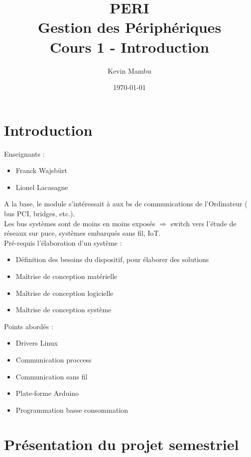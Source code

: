 \documentclass[10pt]{article}
\author{Kevin Mambu}
\date{\today}
\title{PERI \\ Gestion des Périphériques \\ Cours 1 - Introduction}
\begin{document}
\maketitle

\newpage
\tableofcontents

\newpage

\section{Introduction}
Enseignants :
\begin{itemize}
  \item Franck Wajsbürt
  \item Lionel Lacasagne
\end{itemize}

A la base, le module s'intéressait à aux bs de communications de l'Ordinateur (
bus PCI, bridges, etc.).\\
Les bus systèmes sont de moins en moins exposés $\Rightarrow$ switch vers l'étude
de réseaux sur puce, systèmes embarqués sans fil, IoT.\\

Pré-requis l'élaboration d'un système :
\begin{itemize}
  \item Définition des besoins du dispositif, pour élaborer des solutions
  \item Maîtrise de conception matérielle
  \item Maîtrise de conception logicielle
  \item Maîtrise de conception système
\end{itemize}

Points abordés :
\begin{itemize}
  \item Drivers Linux
  \item Communication proccess
  \item Communication sans fil
  \item Plate-forme Arduino
  \item Programmation basse consommation
\end{itemize}

\section{Présentation du projet semestriel}
\end{document}
